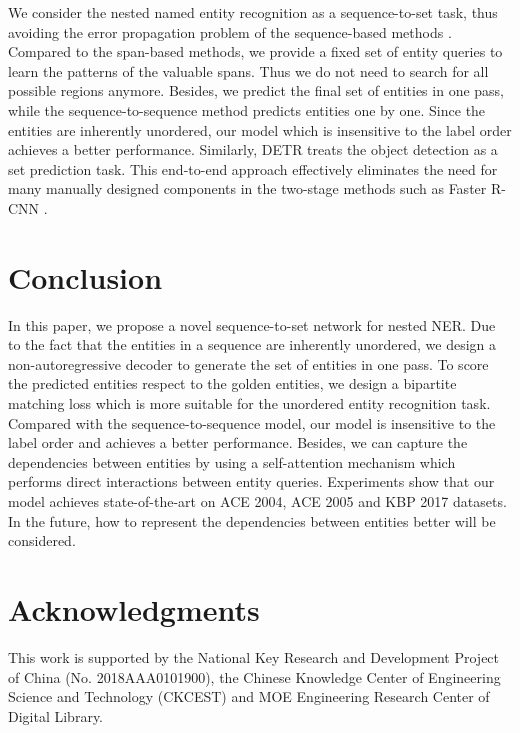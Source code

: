 \documentclass{article}
\begin{document}
We consider the nested named entity recognition as a sequence-to-set task, thus avoiding the error propagation problem of the sequence-based methods \cite{ju2018neural}. Compared to the span-based methods, we provide a fixed set of entity queries to learn the patterns of the valuable spans. Thus we do not need to search for all possible regions anymore. Besides, we predict the final set of entities in one pass, while the sequence-to-sequence method \cite{strakova2019neural} predicts entities one by one. Since the entities are inherently unordered, our model which is insensitive to the label order achieves a better performance. Similarly, DETR \cite{carion2020end} treats the object detection as a set prediction task. This end-to-end approach effectively eliminates the need for many manually designed components in the two-stage methods such as Faster R-CNN \cite{ren2016faster}.

\section{Conclusion}
In this paper, we propose a novel sequence-to-set network for nested NER. Due to the fact that the entities in a sequence are inherently unordered, we design a non-autoregressive decoder to generate the set of entities in one pass. To score the predicted entities respect to the golden entities, we design a bipartite matching loss which is more suitable for the unordered entity recognition task. Compared with the sequence-to-sequence model, our model is insensitive to the label order and achieves a better performance. Besides, we can capture the dependencies between entities by using a self-attention mechanism which performs direct interactions between entity queries. Experiments show that our model achieves state-of-the-art on 
ACE 2004, ACE 2005 and KBP 2017 datasets. In the future, how to represent the dependencies between entities better will be considered.

\section*{Acknowledgments}

This work is supported by the National Key Research and Development Project of China (No. 2018AAA0101900), the Chinese Knowledge Center of Engineering Science and Technology (CKCEST) and MOE Engineering Research Center of Digital Library.




\end{document}
